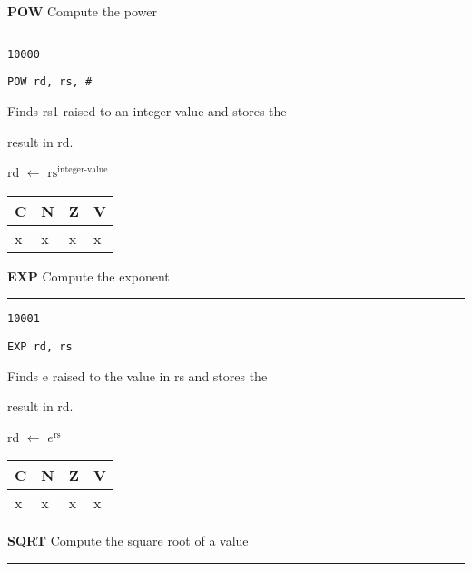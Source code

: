 \documentclass{article}
\begin{document}
\bigskip\bigskip

\flushleft
\LARGE\textbf{POW} \large \hfill Compute the power

\kern-3pt
\noindent\rule{16.5cm}{0.4pt}
\normalsize

{\large
	 \texttt{10000} \par
	\smallbreak
	 \texttt{POW rd, rs, \#<22-bit integer-value>} \par
	\smallbreak
	 Finds rs1 raised to an integer value and stores the \par
	\makebox[3.5cm][l]{  } result in rd. \par
	\smallbreak
	 rd $\leftarrow$ $\textrm{rs}^{\textrm{integer-value}}$ \par
	\smallbreak
	 \begin{tabular}{llll} C \quad & N \quad & Z \quad & V \\ \hline x & x & x & x \\ \end{tabular}
}

\bigskip\bigskip

\flushleft
\LARGE\textbf{EXP} \large \hfill Compute the exponent

\kern-3pt
\noindent\rule{16.5cm}{0.4pt}
\normalsize

{\large
	 \texttt{10001} \par
	\smallbreak
	 \texttt{EXP rd, rs} \par
	\smallbreak
	 Finds e raised to the value in rs and stores the \par
	\makebox[3.5cm][l]{  } result in rd. \par
	\smallbreak
	 rd $\leftarrow$ $e^{\textrm{rs}}$ \par
	\smallbreak
	 \begin{tabular}{llll} C \quad & N \quad & Z \quad & V \\ \hline x & x & x & x \\ \end{tabular}
}

\pagebreak

\flushleft
\LARGE\textbf{SQRT} \large \hfill Compute the square root of a value

\kern-3pt
\noindent\rule{16.5cm}{0.4pt}
\normalsize
\end{document}
